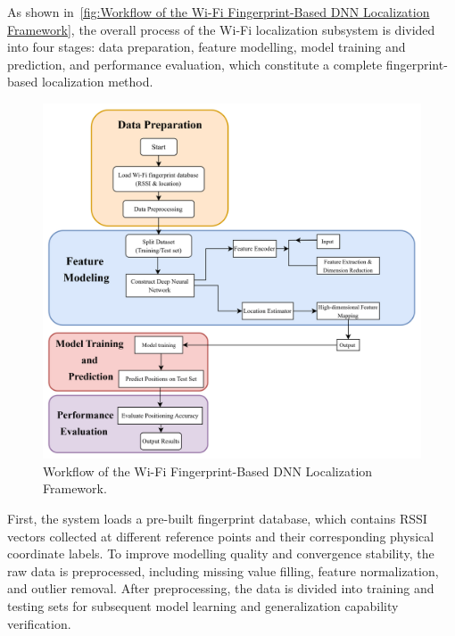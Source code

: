 \documentclass[12pt,a4paper]{article}
\numberwithin{equation}{section}
\begin{document}
As shown in~\autoref{fig:Workflow of the Wi-Fi Fingerprint-Based DNN
  Localization Framework}, the overall process of the Wi-Fi localization
subsystem is divided into four stages: data preparation, feature modelling,
model training and prediction, and performance evaluation, which constitute a
complete fingerprint-based localization method.
\begin{figure}[H]
  \centering
  \includegraphics[width=0.8\linewidth]{images/2.png}
  \caption{Workflow of the Wi-Fi Fingerprint-Based DNN Localization Framework.}
  \label{fig:Workflow of the Wi-Fi Fingerprint-Based DNN Localization Framework}
\end{figure}

First, the system loads a pre-built fingerprint database, which contains RSSI
vectors collected at different reference points and their corresponding physical
coordinate labels. To improve modelling quality and convergence stability, the
raw data is preprocessed, including missing value filling, feature
normalization, and outlier removal. After preprocessing, the data is divided
into training and testing sets for subsequent model learning and generalization
capability verification.
\end{document}
